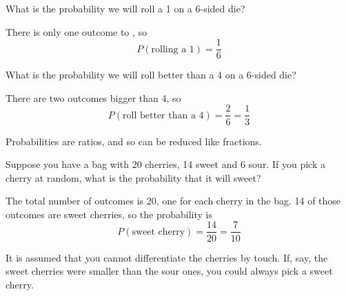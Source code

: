 \documentclass{beamer}
\newcommand{\prob}[1]{P\left(#1\right)}
\begin{document}
\begin{frame}
\begin{example}
What is the probability we will roll a 1 on a 6-sided die?\pause

\vspace{2mm}
There is only one outcome to , so
\begin{equation*}
\prob{\text{rolling a 1}} = \dfrac{1}{6}
\end{equation*}
\end{example}\pause

\begin{example}
What is the probability we will roll better than a 4 on a 6-sided die?\pause

\vspace{2mm}
There are two outcomes bigger than 4, so
\begin{equation*}
\prob{\text{roll better than a 4}} = \dfrac{2}{6} = \dfrac{1}{3}
\end{equation*}
\end{example}\pause

\begin{note}
Probabilities are ratios, and so can be reduced like fractions.
\end{note}
\end{frame}

\begin{frame}
\begin{example}
Suppose you have a bag with 20 cherries, 14 sweet and 6 sour. If you pick a cherry at random, what is the probability that it will sweet?\pause

\vspace{2mm}
The total number of outcomes is 20, one for each cherry in the bag. 14 of those outcomes are sweet cherries, so the probability is
\begin{equation*}
\prob{\text{sweet cherry}} = \dfrac{14}{20} = \dfrac{7}{10}
\end{equation*}
\end{example}\pause

\begin{note}
It is assumed that you cannot differentiate the cherries by touch. If, say, the sweet cherries were smaller than the sour ones, you could always pick a sweet cherry.
\end{note}
\end{frame}
\end{document}

